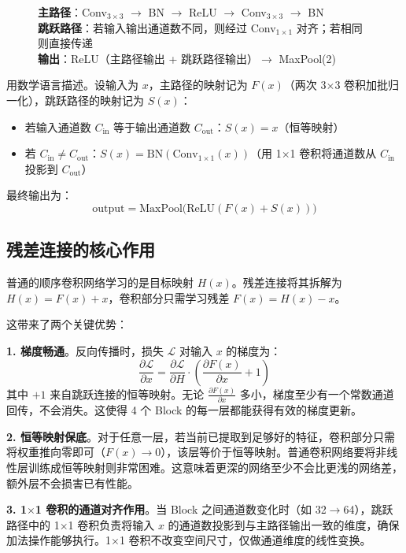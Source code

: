 \documentclass[12pt,a4paper]{ctexart}
\begin{document}
\begin{figure}[H]
\centering
\textbf{主路径}：Conv$_{3\times3}$ $\rightarrow$ BN $\rightarrow$ ReLU $\rightarrow$ Conv$_{3\times3}$ $\rightarrow$ BN \\
\textbf{跳跃路径}：若输入输出通道数不同，则经过 Conv$_{1\times1}$ 对齐；若相同则直接传递 \\
\textbf{输出}：ReLU（主路径输出 + 跳跃路径输出）$\rightarrow$ MaxPool(2)
\end{figure}

用数学语言描述。设输入为 $x$，主路径的映射记为 $F(x)$（两次 3$\times$3 卷积加批归一化），跳跃路径的映射记为 $S(x)$：

\begin{itemize}
\item 若输入通道数 $C_{\text{in}}$ 等于输出通道数 $C_{\text{out}}$：$S(x) = x$（恒等映射）
\item 若 $C_{\text{in}} \neq C_{\text{out}}$：$S(x) = \text{BN}(\text{Conv}_{1\times1}(x))$（用 1$\times$1 卷积将通道数从 $C_{\text{in}}$ 投影到 $C_{\text{out}}$）
\end{itemize}

最终输出为：
\[
\text{output} = \text{MaxPool}\big(\text{ReLU}(F(x) + S(x))\big)
\]

\subsection{残差连接的核心作用}

普通的顺序卷积网络学习的是目标映射 $H(x)$。残差连接将其拆解为 $H(x) = F(x) + x$，卷积部分只需学习残差 $F(x) = H(x) - x$。

这带来了两个关键优势：

\textbf{1. 梯度畅通}。反向传播时，损失 $\mathcal{L}$ 对输入 $x$ 的梯度为：
\[
\frac{\partial\mathcal{L}}{\partial x} = \frac{\partial\mathcal{L}}{\partial H} \cdot \left(\frac{\partial F(x)}{\partial x} + 1\right)
\]
其中 $+1$ 来自跳跃连接的恒等映射。无论 $\frac{\partial F(x)}{\partial x}$ 多小，梯度至少有一个常数通道回传，不会消失。这使得 4 个 Block 的每一层都能获得有效的梯度更新。

\textbf{2. 恒等映射保底}。对于任意一层，若当前已提取到足够好的特征，卷积部分只需将权重推向零即可（$F(x) \rightarrow 0$），该层等价于恒等映射。普通卷积网络要将非线性层训练成恒等映射则非常困难。这意味着更深的网络至少不会比更浅的网络差，额外层不会损害已有性能。

\textbf{3. 1$\times$1 卷积的通道对齐作用}。当 Block 之间通道数变化时（如 32$\rightarrow$64），跳跃路径中的 1$\times$1 卷积负责将输入 $x$ 的通道数投影到与主路径输出一致的维度，确保加法操作能够执行。1$\times$1 卷积不改变空间尺寸，仅做通道维度的线性变换。
\end{document}
